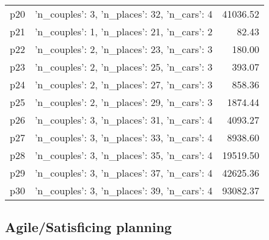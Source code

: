 \documentclass{article}
\begin{document}
\begin{center}
\begin{tabular}{@{}l|r|r@{}}
  p20&{'n\_couples': 3, 'n\_places': 32, 'n\_cars': 4}&41036.52\\
  p21&{'n\_couples': 1, 'n\_places': 21, 'n\_cars': 2}&82.43\\
  p22&{'n\_couples': 2, 'n\_places': 23, 'n\_cars': 3}&180.00\\
  p23&{'n\_couples': 2, 'n\_places': 25, 'n\_cars': 3}&393.07\\
  p24&{'n\_couples': 2, 'n\_places': 27, 'n\_cars': 3}&858.36\\
  p25&{'n\_couples': 2, 'n\_places': 29, 'n\_cars': 3}&1874.44\\
  p26&{'n\_couples': 3, 'n\_places': 31, 'n\_cars': 4}&4093.27\\
  p27&{'n\_couples': 3, 'n\_places': 33, 'n\_cars': 4}&8938.60\\
  p28&{'n\_couples': 3, 'n\_places': 35, 'n\_cars': 4}&19519.50\\
  p29&{'n\_couples': 3, 'n\_places': 37, 'n\_cars': 4}&42625.36\\
  p30&{'n\_couples': 3, 'n\_places': 39, 'n\_cars': 4}&93082.37
                            \end{tabular}
                            \end{center}
                    

                                \subsection*{Agile/Satisficing planning}
                                
\end{document}
